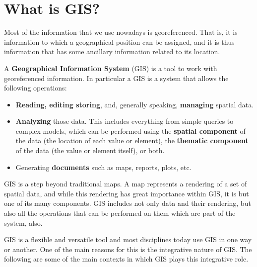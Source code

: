 
\chapter{What is GIS?}

\pagestyle{fancy}

Most of the information that we use nowadays is georeferenced. That is, it is information to which a geographical position can be assigned, and it is thus information that has some ancillary information related to its location.

A \textbf{Geographical Information System} (GIS) is a tool to work with georeferenced information. In particular a GIS is a system that allows the following operations:

\begin{itemize}
	\item \textbf{Reading, editing storing}, and, generally speaking, \textbf{managing} spatial data.
	\item \textbf{Analyzing} those data. This includes everything from simple queries to complex models, which can be performed using the \textbf{spatial component} of the data (the location of each value or element), the \textbf{thematic component} of the data (the value or element itself), or both.
	\item Generating \textbf{documents} such as maps, reports, plots, etc.
\end{itemize}


GIS is a step beyond traditional maps. A map represents a rendering of a set of spatial data, and while this rendering has great importance within GIS, it is but one of its many components. GIS includes not only data and their rendering, but also all the operations that can be performed on them which are part of the system, also.

GIS is a flexible and versatile tool and most disciplines today use GIS in one way or another. One of the main reasons for this is the integrative nature of GIS. The following are some of the main contexts in which GIS plays this integrative role.



